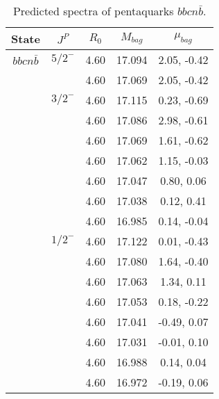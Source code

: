 \documentclass[prd,twocolumn,floatfix,nofootinbib]{revtex4}
\begin{document}
\renewcommand{\tabcolsep}{0.5cm}
\renewcommand{\arraystretch}{1.2}
\begin{table*}[!htbp]
    \caption{Predicted spectra of pentaquarks $bbcn\bar{b}$.}
    \begin{tabular}{ccccc}
        \hline\hline
        {\rm State} &$J^{P}$ &$R_{0}$ &$M_{bag}$ &$\mu_{bag}$ \\ \hline
        ${bbcn\bar{b}}$
            &${5/2}^{-}$    &4.60   &17.094 &2.05, -0.42 \\
            &               &4.60   &17.069 &2.05, -0.42 \\
            &${3/2}^{-}$    &4.60   &17.115 &0.23, -0.69 \\
            &               &4.60   &17.086 &2.98, -0.61 \\
            &               &4.60   &17.069 &1.61, -0.62 \\
            &               &4.60   &17.062 &1.15, -0.03 \\
            &               &4.60   &17.047 &0.80, 0.06 \\
            &               &4.60   &17.038 &0.12, 0.41 \\
            &               &4.60   &16.985 &0.14, -0.04 \\
            &${1/2}^{-}$    &4.60   &17.122 &0.01, -0.43 \\
            &               &4.60   &17.080 &1.64, -0.40 \\
            &               &4.60   &17.063 &1.34, 0.11 \\
            &               &4.60   &17.053 &0.18, -0.22 \\
            &               &4.60   &17.041 &-0.49, 0.07 \\
            &               &4.60   &17.031 &-0.01, 0.10 \\
            &               &4.60   &16.988 &0.14, 0.04 \\
            &               &4.60   &16.972 &-0.19, 0.06 \\
        \hline\hline 
    \end{tabular}
\end{table*}
\end{document}

